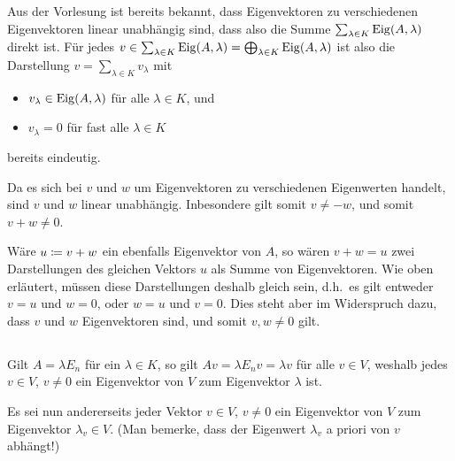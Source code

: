 \section{}





\subsection{}

Aus der Vorlesung ist bereits bekannt, dass Eigenvektoren zu verschiedenen Eigenvektoren linear unabhängig sind, dass also die Summe $\sum_{\lambda \in K} \operatorname{Eig}(A, \lambda)$ direkt ist.
Für jedes $v \in \sum_{\lambda \in K} \operatorname{Eig}(A, \lambda) = \bigoplus_{\lambda \in K} \operatorname{Eig}(A, \lambda)$ ist also die Darstellung $v = \sum_{\lambda \in K} v_\lambda$ mit
\begin{itemize}
  \item
    $v_{\lambda} \in \operatorname{Eig}(A, \lambda)$ für alle $\lambda \in K$, und
  \item
    $v_\lambda = 0$ für fast alle $\lambda \in K$
\end{itemize}
bereits eindeutig.

Da es sich bei $v$ und $w$ um Eigenvektoren zu verschiedenen Eigenwerten handelt, sind $v$ und $w$ linear unabhängig.
Inbesondere gilt somit $v \neq -w$, und somit $v + w \neq 0$.

Wäre $u \coloneqq v + w$ ein ebenfalls Eigenvektor von $A$, so wären $v + w = u$ zwei Darstellungen des gleichen Vektors $u$ als Summe von Eigenvektoren.
Wie oben erläutert, müssen diese Darstellungen deshalb gleich sein, d.h.\ es gilt entweder $v = u$ und $w = 0$, oder $w = u$ und $v = 0$.
Dies steht aber im Widerspruch dazu, dass $v$ und $w$ Eigenvektoren sind, und somit $v, w \neq 0$ gilt.





\subsection{}

Gilt $A = \lambda E_n$ für ein $\lambda \in K$, so gilt $Av = \lambda E_n v = \lambda v$ für alle $v \in V$, weshalb jedes $v \in V$, $v \neq 0$ ein Eigenvektor von $V$ zum Eigenvektor $\lambda$ ist.

Es sei nun andererseits jeder Vektor $v \in V$, $v \neq 0$ ein Eigenvektor von $V$ zum Eigenvektor $\lambda_v \in V$.
(Man bemerke, dass der Eigenwert $\lambda_v$ a priori von $v$ abhängt!)

